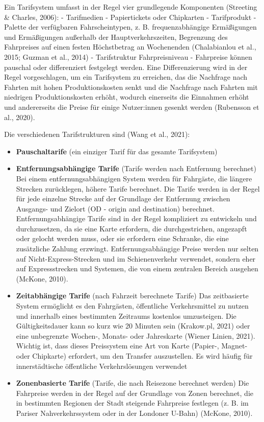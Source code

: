\documentclass[
]{book}
\providecommand{\tightlist}{%
  \setlength{\itemsep}{0pt}\setlength{\parskip}{0pt}}
\begin{document}
Ein Tarifsystem umfasst in der Regel vier grundlegende Komponenten (Streeting \& Charles, 2006):
- Tarifmedien - Papiertickets oder Chipkarten
- Tarifprodukt - Palette der verfügbaren Fahrscheintypen, z. B. frequenzabhängige Ermäßigungen und Ermäßigungen außerhalb der Hauptverkehrszeiten, Begrenzung des Fahrpreises auf einen festen Höchstbetrag an Wochenenden (Chalabianlou et al., 2015; Guzman et al., 2014)
- Tarifstruktur
Fahrpreisniveau - Fahrpreise können pauschal oder differenziert festgelegt werden. Eine Differenzierung wird in der Regel vorgeschlagen, um ein Tarifsystem zu erreichen, das die Nachfrage nach Fahrten mit hohen Produktionskosten senkt und die Nachfrage nach Fahrten mit niedrigen Produktionskosten erhöht, wodurch einerseits die Einnahmen erhöht und andererseits die Preise für einige Nutzer:innen gesenkt werden (Rubensson et al., 2020).

Die verschiedenen Tarifstrukturen sind (Wang et al., 2021):

\begin{itemize}
\tightlist
\item
  \textbf{Pauschaltarife } (ein einziger Tarif für das gesamte Tarifsystem)
\item
  \textbf{Entfernungsabhängige Tarife} (Tarife werden nach Entfernung berechnet)
  Bei einem entfernungsabhängigen System werden für Fahrgäste, die längere Strecken zurücklegen, höhere Tarife berechnet. Die Tarife werden in der Regel für jede einzelne Strecke auf der Grundlage der Entfernung zwischen Ausgangs- und Zielort (OD - origin and destination) berechnet. Entfernungsabhängige Tarife sind in der Regel kompliziert zu entwickeln und durchzusetzen, da sie eine Karte erfordern, die durchgestrichen, angezapft oder gelocht werden muss, oder sie erfordern eine Schranke, die eine zusätzliche Zahlung erzwingt. Entfernungsabhängige Preise werden nur selten auf Nicht-Express-Strecken und im Schienenverkehr verwendet, sondern eher auf Expressstrecken und Systemen, die von einem zentralen Bereich ausgehen (McKone, 2010).
\item
  \textbf{Zeitabhängige Tarife} (nach Fahrzeit berechnete Tarife)
  Das zeitbasierte System ermöglicht es den Fahrgästen, öffentliche Verkehrsmittel zu nutzen und innerhalb eines bestimmten Zeitraums kostenlos umzusteigen. Die Gültigkeitsdauer kann so kurz wie 20 Minuten sein (Krakow.pl, 2021) oder eine unbegrenzte Wochen-, Monats- oder Jahreskarte (Wiener Linien, 2021). Wichtig ist, dass dieses Preissystem eine Art von Karte (Papier-, Magnet- oder Chipkarte) erfordert, um den Transfer auszustellen. Es wird häufig für innerstädtische öffentliche Verkehrslösungen verwendet
\item
  \textbf{Zonenbasierte Tarife} (Tarife, die nach Reisezone berechnet werden)
  Die Fahrpreise werden in der Regel auf der Grundlage von Zonen berechnet, die in bestimmten Regionen der Stadt steigende Fahrpreise festlegen (z. B. im Pariser Nahverkehrssystem oder in der Londoner U-Bahn) (McKone, 2010).
\end{itemize}
\end{document}
